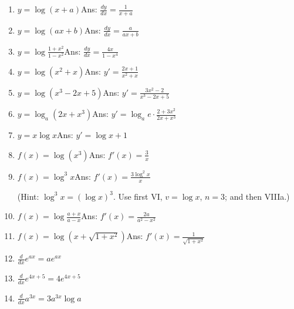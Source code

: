 \begin{enumerate}

\item
$y = \log(x + a)$\qquad\qquad\qquad\qquad\qquad\qquad Ans: 	$\frac{dy}{dx} = \frac{1}{x + a}$

\item
$y = \log(ax + b)$\qquad\qquad\qquad\qquad\qquad\qquad Ans: 	$\frac{dy}{dx} = \frac{a}{ax + b}$

\item
$y = \log \frac{1 + x^2}{1 - x^2}$\qquad\qquad\qquad\qquad\qquad\qquad Ans: 	$\frac{dy}{dx} = \frac{4x}{1 - x^4}$

\item
$y = \log(x^2 + x)$\qquad\qquad\qquad\qquad\qquad\qquad Ans: 	$y' = \frac{2x + 1}{x^2 + x}$

\item
$y = \log(x^3 - 2x + 5)$\qquad\qquad\qquad\qquad\qquad\qquad Ans: 	$y' = \frac{3x^2 - 2}{x^3 - 2x + 5}$

\item
$y = \log_a(2x + x^3)$\qquad\qquad\qquad\qquad\qquad\qquad Ans: 	$y' = \log_a e \cdot \frac{2 + 3x^2}{2x + x^3}$

\item
$y = x\log x$\qquad\qquad\qquad\qquad\qquad\qquad Ans: 	$y' = \log x + 1$

\item
$f(x) = \log (x^3)$\qquad\qquad\qquad\qquad\qquad\qquad Ans: 	$f'(x) = \frac{3}{x}$

\item
$f(x) = \log^3 x$\qquad\qquad\qquad\qquad\qquad\qquad Ans: 	$f'(x) = \frac{3 \log^2 x}{x}$

(Hint: $\log^3x = (\log x)^3$. Use first VI, $v = \log x$, $n = 3$; and then VIIIa.)

\item
$f(x) = \log \frac{a + x}{a - x}$\qquad\qquad\qquad\qquad\qquad\qquad Ans: 	$f'(x) = \frac{2a}{a^2 - x^2}$

\item
$f(x) = \log (x + \sqrt{1 + x^2})$\qquad\qquad\qquad\qquad\qquad\qquad Ans: 	$f'(x) = \frac{1}{\sqrt{1 + x^2}}$

\item
$\frac{d}{dx} e^{ax} = ae^{ax}$

\item
$\frac{d}{dx} e^{4x + 5} = 4e^{4x + 5}$

\item
$\frac{d}{dx} a^{3x} = 3a^{3x} \log a$


\end{enumerate}
